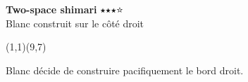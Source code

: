 \documentclass[preview, border=0pt, varwidth=false]{standalone}
\begin{document}
	\setgounit{0.6cm} 
	
	\parbox[c][14.65cm][c]{10.2cm}{
		\centering
		
		{\Large\textbf{Two-space shimari} $\medblackstar \medblackstar \medblackstar \medwhitestar$ \\ Blanc construit sur le côté droit}
		\vspace{3em}
		
		\begin{psgopartialboard}{(1,1)(9,7)}
			\pass
		\end{psgopartialboard}
		
		\vspace{1em}
		Blanc décide de construire pacifiquement le bord droit.
	}
	
\end{document}
